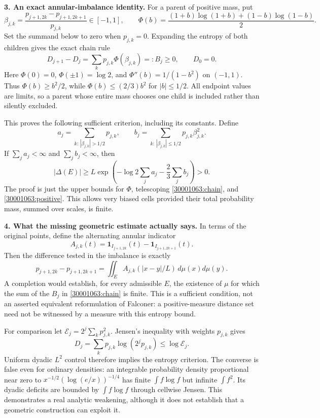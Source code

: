 \documentclass[11pt,a4paper]{article}
\begin{document}
\textbf{3. An exact annular-imbalance identity.}
For a parent of positive mass, put
\[
 \beta_{j,k}=\frac{p_{j+1,2k}-p_{j+1,2k+1}}{p_{j,k}}\in[-1,1],
 \qquad
 \Phi(b)=\frac{(1+b)\log(1+b)+(1-b)\log(1-b)}2.
\]
Set the summand below to zero when $p_{j,k}=0$. Expanding the entropy of
both children gives the exact chain rule
\begin{equation}\label{30001063:chain}
 D_{j+1}-D_j=\sum_k p_{j,k}\Phi(\beta_{j,k})=:B_j\ge0,
 \qquad D_0=0.
\end{equation}
Here $\Phi(0)=0$, $\Phi(\pm1)=\log2$, and
$\Phi''(b)=1/(1-b^2)$ on $(-1,1)$.
Thus $\Phi(b)\ge b^2/2$, while $\Phi(b)\le(2/3)b^2$ for $|b|\le1/2$.
All endpoint values are limits, so a parent whose entire mass chooses one
child is included rather than silently excluded.

This proves the following sufficient criterion, including its constants.
Define
\[
 a_j=\sum_{k:\,|\beta_{j,k}|>1/2}p_{j,k},\qquad
 b_j=\sum_{k:\,|\beta_{j,k}|\le1/2}p_{j,k}\beta_{j,k}^2.
\]
If $\sum_j a_j<\infty$ and $\sum_j b_j<\infty$, then
\begin{equation}\label{30001063:budget}
 |\Delta(E)|\ge
 L\exp\left(-\log2\sum_j a_j-\frac23\sum_j b_j\right)>0.
\end{equation}
The proof is just the upper bounds for $\Phi$, telescoping
\eqref{30001063:chain}, and \eqref{30001063:positive}. This allows very biased cells
provided their total probability mass, summed over scales, is finite.

\textbf{4. What the missing geometric estimate actually says.}
In terms of the original points, define the alternating annular indicator
\[
 A_{j,k}(t)=\mathbf1_{I_{j+1,2k}}(t)-\mathbf1_{I_{j+1,2k+1}}(t).
\]
Then the difference tested in the imbalance is exactly
\[
 p_{j+1,2k}-p_{j+1,2k+1}
   =\iint_E A_{j,k}(|x-y|/L)\,d\mu(x)d\mu(y).
\]
A completion would establish, for every admissible $E$, the existence of
$\mu$ for which the sum of the $B_j$ in \eqref{30001063:chain} is finite.
This is a sufficient condition, not an asserted equivalent reformulation
of Falconer: a positive-measure distance set need not be witnessed by a
measure with this entropy bound.

For comparison let $\mathcal E_j=2^j\sum_kp_{j,k}^2$. Jensen's inequality
with weights $p_{j,k}$ gives
\[
 D_j=\sum_kp_{j,k}\log(2^jp_{j,k})\le\log\mathcal E_j.
\]
Uniform dyadic $L^2$ control therefore implies the entropy criterion. The
converse is false even for ordinary densities: an integrable probability
density proportional near zero to
$x^{-1/2}(\log(e/x))^{-1/4}$ has finite $\int f\log f$ but infinite
$\int f^2$. Its dyadic deficits are bounded by $\int f\log f$ through
cellwise Jensen. This demonstrates a real analytic weakening, although
it does not establish that a geometric construction can exploit it.
\end{document}
